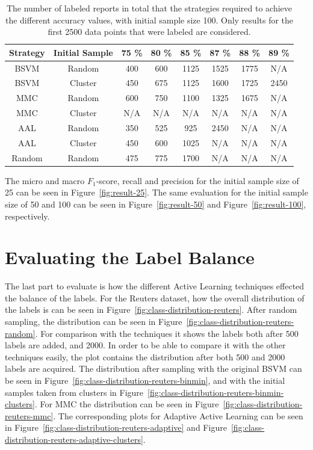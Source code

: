 \begin{table}
    \centering
    \begin{tabular}{|cccccccc|}
        \hline
        \textbf{Strategy} & \textbf{Initial Sample} & \textbf{75 \%} & \textbf{80 \%} & \textbf{85 \%} & \textbf{87 \%} & \textbf{88 \%} & \textbf{89 \%}\\
        \hline
        BSVM & Random & 400 & 600 & 1125 & 1525 & 1775 & N/A\\
        BSVM & Cluster & 450 & 675 & 1125 & 1600 & 1725 & 2450\\
        MMC & Random & 600 & 750 & 1100 & 1325 & 1675 & N/A\\
        MMC & Cluster & N/A & N/A & N/A & N/A & N/A & N/A\\
        AAL & Random & 350 & 525 & 925 & 2450 & N/A & N/A\\
        AAL & Cluster & 450 & 600 & 1025 & N/A & N/A & N/A\\
        Random & Random & 475 & 775 & 1700 & N/A & N/A & N/A\\
        \hline
    \end{tabular}
    \caption{The number of labeled reports in total that the strategies required to achieve the different accuracy values, with initial sample size 100. Only results for the first 2500 data points that were labeled are considered.}
    \label{tab:active-learning-accuracy-100}
\end{table}

The micro and macro $F_1$-score, recall and precision for the initial sample size of 25 can be seen in Figure~\ref{fig:result-25}.
The same evaluation for the initial sample size of 50 and 100 can be seen in Figure~\ref{fig:result-50} and Figure~\ref{fig:result-100}, respectively.


\section{Evaluating the Label Balance}

The last part to evaluate is how the different Active Learning techniques effected the balance of the labels.
For the Reuters dataset, how the overall distribution of the labels is can be seen in Figure~\ref{fig:class-distribution-reuters}.
After random sampling, the distribution can be seen in Figure~\ref{fig:class-distribution-reuters-random}.
For comparison with the techniques it shows the labels both after 500 labels are added, and 2000.
In order to be able to compare it with the other techniques easily, the plot contains the distribution after both 500 and 2000 labels are acquired.
The distribution after sampling with the original BSVM can be seen in Figure~\ref{fig:class-distribution-reuters-binmin}, and with the initial samples taken from clusters in Figure~\ref{fig:class-distribution-reuters-binmin-clusters}.
For MMC the distribution can be seen in Figure~\ref{fig:class-distribution-reuters-mmc}.
The corresponding plots for Adaptive Active Learning can be seen in Figure~\ref{fig:class-distribution-reuters-adaptive} and Figure~\ref{fig:class-distribution-reuters-adaptive-clusters}.

